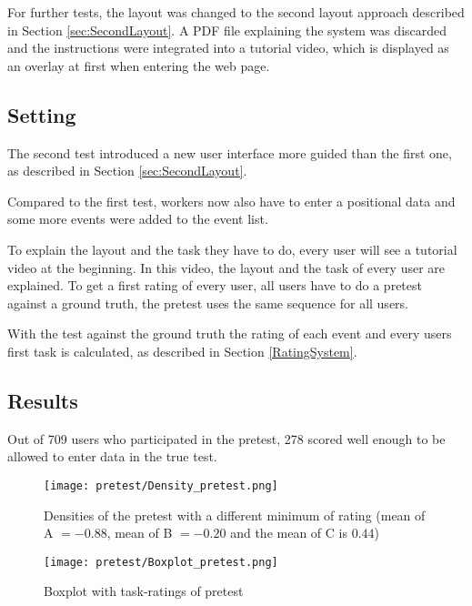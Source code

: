 For further tests, the layout was changed to the second layout approach described in Section \ref{sec:SecondLayout}. A PDF file explaining the system was discarded and the instructions were integrated into a tutorial video, which is displayed as an overlay at first when entering the web page.

\subsection{Setting}

The second test introduced a new user interface more guided than the first one, as described in Section \ref{sec:SecondLayout}.

Compared to the first test, workers now also have to enter a positional data and  some more events were added to the event list.
\newline

To explain the layout and the task they have to do, every user  will see a tutorial video at the beginning. In this video, the layout and the task of every user are explained.
\newline
To get a first rating of every user, all users have to do a pretest against a ground truth, the pretest uses the same sequence for all users.

With the test against the ground truth the rating of each event and every users first task is calculated, as described in Section \ref{RatingSystem}.

\subsection{Results}

Out of 709 users who participated in the pretest, 278 scored well enough to be allowed to enter data in the true test.


\begin{figure}[H]
    \centering
    \texttt{[image: pretest/Density\_pretest.png]}
    \caption{Densities of the pretest with a different minimum of rating (mean of A $= -0.88$, mean of B $ = -0.20$ and the mean of C is $0.44$)}
    \label{img:Density_pretest}
\end{figure}

\begin{figure}[H]
    \centering
    \texttt{[image: pretest/Boxplot\_pretest.png]}
    \caption{Boxplot with task-ratings of pretest}
    \label{img:Boxplot_pretest}
\end{figure}

